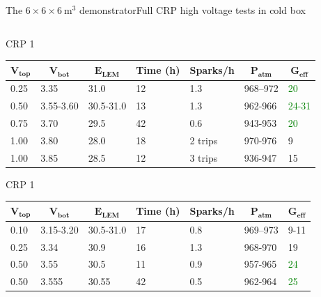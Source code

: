 \documentclass[10pt]{beamer}
\begin{document}
\begin{frame}{The \texorpdfstring{$6 \times 6 \times \SI{6}{\meter\cubed}$}{666} demonstrator}{Full CRP high voltage  tests in cold box}
\begin{columns}
\begin{column}{0.65\textwidth}
\begin{tiny}
\begin{table}[]
\begin{scriptsize}
    						\centering CRP 1
    					\end{scriptsize}
    					\begin{tabular}{|l|l|l|l|l|l|l|}
    						\hline
    						\multicolumn{1}{|c|}{\textbf{$\mathbf{V_{top}}$}} & \multicolumn{1}{c|}{\textbf{$\mathbf{V_{bot}}$}} & \multicolumn{1}{c|}{\textbf{$\mathbf{E_{LEM}}$}} & \multicolumn{1}{c|}{\textbf{Time (h)}} & \multicolumn{1}{c|}{\textbf{Sparks/h}} & \multicolumn{1}{c|}{\textbf{$\mathbf{P_{atm}}$}} & \multicolumn{1}{c|}{\textbf{$\mathbf{G_{eff}}$}} \\ \hline
    						0.25 & 3.35 & 31.0 & 12 & 1.3 & 968--972 & \textcolor{green}{20} \\
    						0.50 & 3.55-3.60 & 30.5-31.0 & 13 & 1.3 & 962-966 & \textcolor{green}{24-31} \\
    						0.75 & 3.70 & 29.5 & 42 & 0.6 & 943-953 & \textcolor{green}{20} \\
    						1.00 & 3.80 & 28.0 & 18 & 2 trips & 970-976 & 9 \\
    						1.00 & 3.85 & 28.5 & 12 & 3 trips & 936-947 & 15 \\ \hline
    					\end{tabular}
    				\end{table}
    				\begin{table}[]
    					\begin{scriptsize}
    						\centering CRP 1
    					\end{scriptsize}
    					\begin{tabular}{|l|l|l|l|l|l|l|}
    						\hline
    						\multicolumn{1}{|c|}{\textbf{$\mathbf{V_{top}}$}} & \multicolumn{1}{c|}{\textbf{$\mathbf{V_{bot}}$}} & \multicolumn{1}{c|}{\textbf{$\mathbf{E_{LEM}}$}} & \multicolumn{1}{c|}{\textbf{Time (h)}} & \multicolumn{1}{c|}{\textbf{Sparks/h}} & \multicolumn{1}{c|}{\textbf{$\mathbf{P_{atm}}$}} & \multicolumn{1}{c|}{\textbf{$\mathbf{G_{eff}}$}} \\ \hline
    						0.10 & 3.15-3.20 & 30.5-31.0 & 17 & 0.8 & 969--973 & 9-11 \\
    						0.25 & 3.34 & 30.9 & 16 & 1.3 & 968-970 & 19 \\
    						0.50 & 3.55 & 30.5 & 11 & 0.9 & 957-965 & \textcolor{green}{24} \\
    						0.50 & 3.555 & 30.55 & 42 & 0.5 & 962-964 & \textcolor{green}{25} \\ \hline
    					\end{tabular}
    				\end{table}
    			\end{tiny}

\end{column}
\end{columns}
\end{frame}
\end{document}
